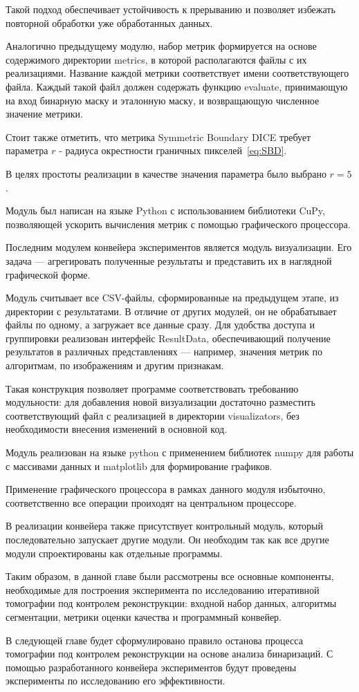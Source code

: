 Такой подход обеспечивает устойчивость к прерыванию и позволяет избежать повторной обработки уже обработанных данных.

Аналогично предыдущему модулю, набор метрик формируется на основе содержимого директории metrics, в которой располагаются файлы с их реализациями. Название каждой метрики соответствует имени соответствующего файла. Каждый такой файл должен содержать функцию evaluate, принимающую на вход бинарную маску и эталонную маску, и возвращающую численное значение метрики.

Стоит также отметить, что метрика Symmetric Boundary DICE требует параметра \(r\) - радиуса окрестности граничных пикселей~\eqref{eq:SBD}.

В целях простоты реализации в качестве значения параметра было выбрано \(r = 5\). 

Модуль был написан на языке Python с использованием библиотеки CuPy, позволяющей ускорить вычисления метрик с помощью графического процессора.

Последним модулем конвейера экспериментов является модуль визуализации. Его задача — агрегировать полученные результаты и представить их в наглядной графической форме.

Модуль считывает все CSV-файлы, сформированные на предыдущем этапе, из директории с результатами. В отличие от других модулей, он не обрабатывает файлы по одному, а загружает все данные сразу. Для удобства доступа и группировки реализован интерфейс ResultData, обеспечивающий получение результатов в различных представлениях — например, значения метрик по алгоритмам, по изображениям и другим признакам.

Такая конструкция позволяет программе соответствовать требованию модульности: для добавления новой визуализации достаточно разместить соответствующий файл с реализацией в директории visualizators, без необходимости внесения изменений в основной код.

Модуль реализован на языке python с применением библиотек numpy для работы с массивами данных и matplotlib для формирование графиков.

Применение графического процессора в рамках данного модуля избыточно, соответственно все операции проиходят на центральном процессоре.

В реализации конвейера также присутствует контрольный модуль, который последовательно запускает другие модули. Он необходим так как все другие модули спроектированы как отдельные программы.

Таким образом, в данной главе были рассмотрены все основные компоненты, необходимые для построения эксперимента по исследованию итеративной томографии под контролем реконструкции: входной набор данных, алгоритмы сегментации, метрики оценки качества и программный конвейер. 

В следующей главе будет сформулировано правило останова процесса томографии под контролем реконструкции на основе анализа бинаризаций. С помощью разработанного конвейера экспериментов будут проведены эксперименты по исследованию его эффективности.